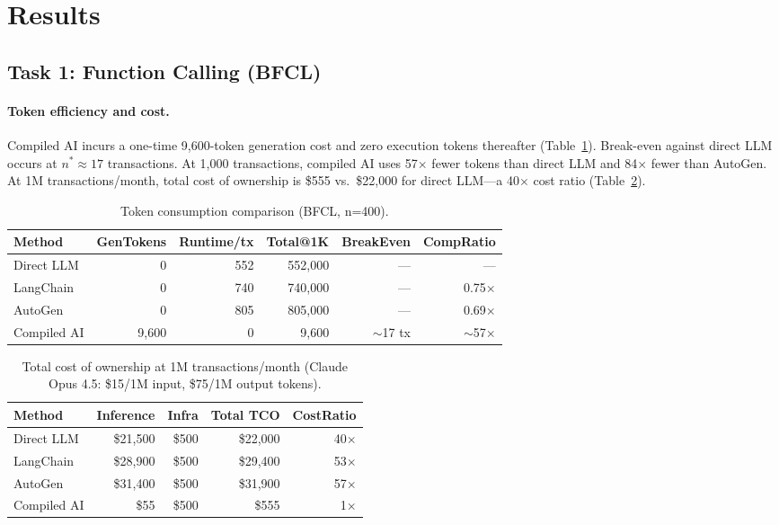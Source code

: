 \documentclass[11pt]{article}
\begin{document}
\section{Results}
\label{sec:results}

\subsection{Task 1: Function Calling (BFCL)}

\paragraph{Token efficiency and cost.} Compiled AI incurs a one-time 9,600-token generation cost and zero execution tokens thereafter (Table~\ref{tab:token-results}). Break-even against direct LLM occurs at $n^* \approx 17$ transactions. At 1,000 transactions, compiled AI uses 57$\times$ fewer tokens than direct LLM and 84$\times$ fewer than AutoGen. At 1M transactions/month, total cost of ownership is \$555 vs.\ \$22,000 for direct LLM---a 40$\times$ cost ratio (Table~\ref{tab:cost-results}).

\begin{table}[ht]
\centering
\caption{Token consumption comparison (BFCL, n=400).}
\label{tab:token-results}
\begin{tabular}{lrrrrr}
\toprule
Method & GenTokens & Runtime/tx & Total@1K & BreakEven & CompRatio \\
\midrule
Direct LLM & 0 & 552 & 552,000 & --- & --- \\
LangChain  & 0 & 740 & 740,000 & --- & 0.75$\times$ \\
AutoGen    & 0 & 805 & 805,000 & --- & 0.69$\times$ \\
Compiled AI & 9,600 & 0 & 9,600 & $\sim$17 tx & $\sim$57$\times$ \\
\bottomrule
\end{tabular}
\end{table}

\begin{table}[ht]
\centering
\caption{Total cost of ownership at 1M transactions/month (Claude Opus 4.5: \$15/1M input, \$75/1M output tokens).}
\label{tab:cost-results}
\begin{tabular}{lrrrr}
\toprule
Method & Inference & Infra & Total TCO & CostRatio \\
\midrule
Direct LLM & \$21,500 & \$500 & \$22,000 & 40$\times$ \\
LangChain  & \$28,900 & \$500 & \$29,400 & 53$\times$ \\
AutoGen    & \$31,400 & \$500 & \$31,900 & 57$\times$ \\
Compiled AI & \$55 & \$500 & \$555 & 1$\times$ \\
\bottomrule
\end{tabular}
\end{table}
\end{document}
